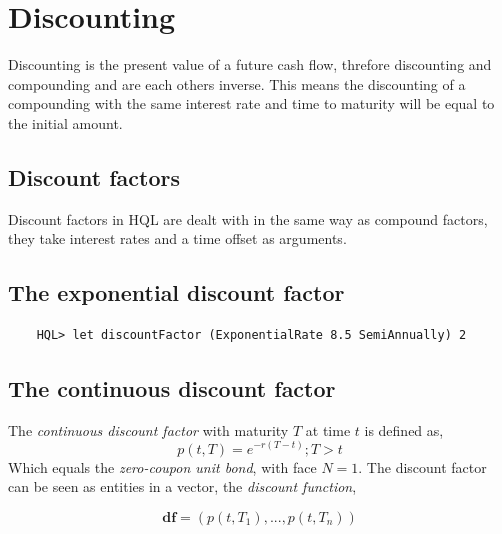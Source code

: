 \documentclass[11pt,a4paper]{article}
\numberwithin{equation}{section}
\begin{document}

	\section{Discounting}
	Discounting is the present value of a future cash flow, threfore discounting and compounding and are each others inverse. This means
	the discounting of a compounding with the same interest rate and time to maturity will be equal to the initial amount.

	\subsection{Discount factors}
	Discount factors in HQL are dealt with in the same way as compound factors, they take interest rates and a time offset as arguments.

	\subsection{The exponential discount factor}

	\begin{lstlisting}
	HQL> let discountFactor (ExponentialRate 8.5 SemiAnnually) 2
	\end{lstlisting}

	\subsection{The continuous discount factor}
	The \textit{continuous discount factor} with maturity $T$ at time $t$ is defined as,
	\[
	p(t,T)=e^{-r(T-t)}; T>t
	\]
	Which equals the \textit{zero-coupon unit bond}, with face $N=1$. The discount factor
	can be seen as entities in a vector, the \textit{discount function},

	\[
	\mathbf{df} = (p(t,T_1), ..., p(t,T_n))
	\]
\end{document}

